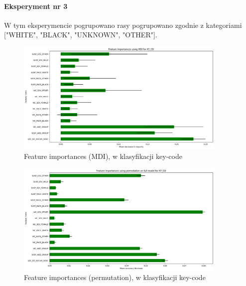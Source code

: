 \documentclass{classrep}
\begin{document}
{{{                \paragraph{Eksperyment nr 3}{
                    W tym eksperymencie pogrupowano rasy pogrupowano zgodnie z
                    kategoriami ["WHITE", "BLACK", "UNKNOWN", "OTHER"].
                    \begin{figure}[!htbp]
                        \centering
                        \includegraphics[width=0.9\textwidth]{img/5.1.3/3/Feature importances using MDI for KY_CD.png}
                        \caption{Feature importances (MDI), w klasyfikacji key-code}
                        \label{goal_1_exp_3_imp_mdi_key}
                    \end{figure}
                    
                    \begin{figure}[!htbp]
                        \centering
                        \includegraphics[width=0.9\textwidth]{img/5.1.3/3/Feature importances using permutation on full model for KY_CD.png}
                        \caption{Feature importances (permutation), w klasyfikacji key-code}
                        \label{goal_1_exp_3_imp_perm_key}
                    \end{figure}
                    
}}}}
\end{document}
